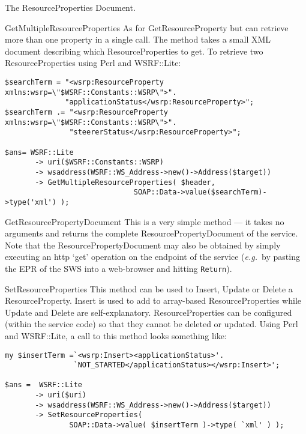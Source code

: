 \documentclass[a4paper]{article}
\begin{document}
\begin{section}{The ResourceProperties Document.}
\begin{subsection}{GetMultipleResourceProperties}
As for GetResourceProperty but can retrieve more than one property in
a single call.  The method takes a small XML document describing which
ResourceProperties to get.  To retrieve two ResourceProperties using
Perl and WSRF::Lite:
\begin{verbatim}
$searchTerm = "<wsrp:ResourceProperty xmlns:wsrp=\"$WSRF::Constants::WSRP\">".
              "applicationStatus</wsrp:ResourceProperty>";
$searchTerm .= "<wsrp:ResourceProperty xmlns:wsrp=\"$WSRF::Constants::WSRP\">".
               "steererStatus</wsrp:ResourceProperty>";

$ans= WSRF::Lite
       -> uri($WSRF::Constants::WSRP)
       -> wsaddress(WSRF::WS_Address->new()->Address($target))
       -> GetMultipleResourceProperties( $header, 
                              SOAP::Data->value($searchTerm)->type('xml') );
\end{verbatim}

\end{subsection}

\begin{subsection}{GetResourcePropertyDocument}
This is a very simple method --- it takes no arguments and returns the
complete ResourcePropertyDocument of the service.  Note that the
ResourcePropertyDocument may also be obtained by simply executing an
http `get' operation on the endpoint of the service (\textit{e.g.}\ by
pasting the EPR of the SWS into a web-browser and hitting \texttt{Return}).
\end{subsection}

\begin{subsection}{SetResourceProperties}
This method can be used to Insert, Update or Delete a
ResourceProperty.  Insert is used to add to array-based
ResourceProperties while Update and Delete are self-explanatory.
ResourceProperties can be configured (within the service code) so that
they cannot be deleted or updated.  Using Perl and WSRF::Lite, a call
to this method looks something like:
\begin{verbatim}
my $insertTerm =`<wsrp:Insert><applicationStatus>'.
                `NOT_STARTED</applicationStatus></wsrp:Insert>';

$ans =  WSRF::Lite
       -> uri($uri)
       -> wsaddress(WSRF::WS_Address->new()->Address($target))  
       -> SetResourceProperties( 
               SOAP::Data->value( $insertTerm )->type( `xml' ) );
\end{verbatim}
\end{subsection}

\end{section}
\end{document}
